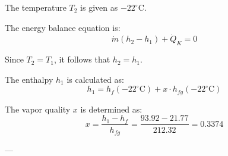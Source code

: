 The temperature \( T_2 \) is given as \( -22^\circ\text{C} \).

The energy balance equation is:  
\[
\dot{m} (h_2 - h_1) + \dot{Q}_K = 0
\]

Since \( T_2 = T_1 \), it follows that \( h_2 = h_1 \).

The enthalpy \( h_1 \) is calculated as:  
\[
h_1 = h_f(-22^\circ\text{C}) + x \cdot h_{fg}(-22^\circ\text{C})
\]

The vapor quality \( x \) is determined as:  
\[
x = \frac{h_1 - h_f}{h_{fg}} = \frac{93.92 - 21.77}{212.32} = 0.3374
\]

---